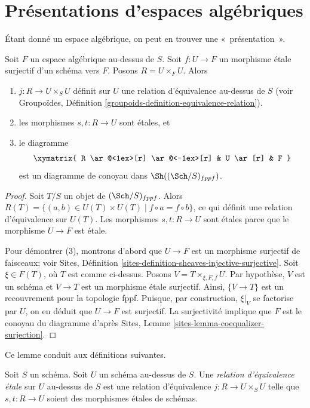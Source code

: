 \section{Présentations d'espaces algébriques}
\label{section-presentations}

\noindent
Étant donné un espace algébrique, on peut en trouver une «~présentation~».


\begin{lemma}
\label{lemma-space-presentation}
Soit $F$ un espace algébrique au-dessus de $S$. Soit $f : U \to F$ un
morphisme \'etale surjectif d'un schéma vers $F$. Posons $R = U \times_F U$.
Alors
\begin{enumerate}
\item $j : R \to U \times_S U$ définit sur
$U$ une relation d'équivalence au-dessus de $S$ (voir
Groupoïdes, Définition \ref{groupoids-definition-equivalence-relation}).
\item les morphismes $s, t : R \to U$ sont \'etales, et
\item le diagramme
$$
\xymatrix{
R \ar@<1ex>[r] \ar@<-1ex>[r] &
U \ar[r] &
F
}
$$
est un diagramme de conoyau dans $\Sh((\Sch/S)_{fppf})$.
\end{enumerate}
\end{lemma}

\begin{proof}
Soit $T/S$ un objet de $(\Sch/S)_{fppf}$.
Alors $R(T) = \{(a, b) \in U(T) \times U(T) \mid f \circ a = f \circ b\}$,
ce qui définit une relation d'équivalence sur $U(T)$.
Les morphismes $s, t : R \to U$ sont \'etales parce que le morphisme
$U \to F$ est \'etale.

\medskip\noindent
Pour démontrer (3), montrons d'abord que
$U \to F$ est un morphisme surjectif de faisceaux; voir
Sites, Définition \ref{sites-definition-sheaves-injective-surjective}.
Soit $\xi \in F(T)$, où $T$ est comme ci-dessus. Posons $V = T \times_{\xi, F, f}U$.
Par hypothèse, $V$ est un schéma et $V \to T$ est un morphisme \'etale surjectif.
Ainsi, $\{V \to T\}$ est un recouvrement pour la topologie fppf.
Puisque, par construction, $\xi|_V$ se factorise par $U$, on
en déduit que $U \to F$ est surjectif. La surjectivité implique que
$F$ est le conoyau du diagramme d'après
Sites, Lemme \ref{sites-lemma-coequalizer-surjection}.
\end{proof}

\noindent
Ce lemme conduit aux définitions suivantes.

\begin{definition}
\label{definition-etale-equivalence-relation}
Soit $S$ un schéma. Soit $U$ un schéma au-dessus de $S$.
Une {\it relation d'équivalence \'etale} sur $U$ au-dessus de $S$
est une relation d'équivalence $j : R \to U \times_S U$
telle que $s, t : R \to U$ soient des morphismes \'etales de schémas.
\end{definition}

